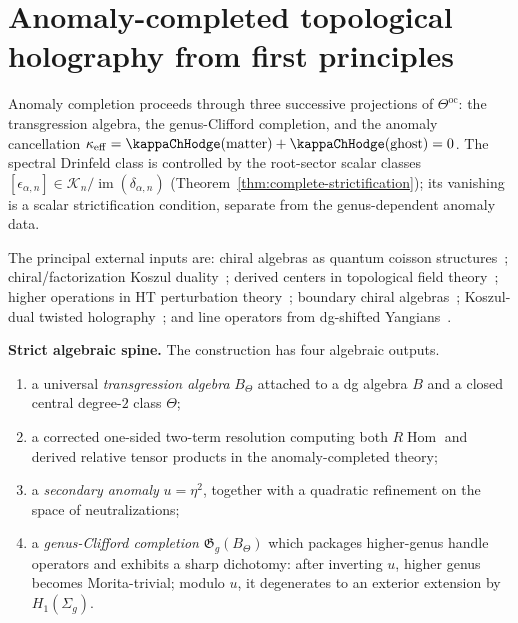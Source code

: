 
\section{Anomaly-completed topological holography from first principles}
\label{app:anomaly-completed-topological-holography}


Anomaly completion proceeds through three successive projections of
$\Theta^{\mathrm{oc}}$: the transgression algebra, the genus-Clifford
completion, and the anomaly cancellation
$\kappa_{\mathrm{eff}} = \kappaChHodge(\text{matter}) + \kappaChHodge(\text{ghost}) = 0$.
The spectral Drinfeld class is controlled by the root-sector scalar
classes
$[\epsilon_{\alpha,n}]\in
\mathscr K_n/\operatorname{im}(\delta_{\alpha,n})$
(Theorem~\ref{thm:complete-strictification}); its vanishing is a
scalar strictification condition, separate from the genus-dependent
anomaly data.

The principal external inputs are:
chiral algebras as quantum coisson structures~\cite{BD04};
chiral/factorization Koszul duality~\cite{FG12};
derived centers in topological field theory~\cite{costello-gaiotto,CP2020,DNP25};
higher operations in HT perturbation theory~\cite{GKW25};
boundary chiral algebras~\cite{CDG20};
Koszul-dual twisted holography~\cite{Zeng23};
and line operators from dg-shifted Yangians~\cite{DNP25}.

\medskip

\noindent\textbf{Strict algebraic spine.}
The construction has four algebraic outputs.
\begin{enumerate}
\item a universal \emph{transgression algebra} \(B_{\Theta}\) attached to a dg algebra \(B\) and a closed central degree-\(2\) class \(\Theta\);
\item a corrected one-sided two-term resolution computing both \(R\!\operatorname{Hom}\) and derived relative tensor products in the anomaly-completed theory;
\item a \emph{secondary anomaly} \(u=\eta^{2}\), together with a quadratic refinement on the space of neutralizations;
\item a \emph{genus-Clifford completion} \(\mathfrak{G}_{g}(B_{\Theta})\) which packages higher-genus handle operators and exhibits a sharp dichotomy:
after inverting \(u\), higher genus becomes Morita-trivial; modulo \(u\), it degenerates to an exterior extension by \(H_{1}(\Sigma_{g})\).
\end{enumerate}

